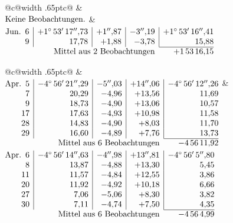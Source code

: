 \noindent\begin{tabular}{@{}c@{\hspace{.4em}\vrule width .65pt\hspace{.4em}}c@{}}
 &
 \\[.18ex]
\(\begin{array}[t]{@{}l@{}}\text{Keine Beobachtungen.}\end{array}\)
&
\(\begin{array}[t]{@{}r|r|r|r|r@{}}
\text{Jun.}\enspace 6 & +1^\circ\,53'\,17''{,}73 & +1''{,}87 & -3''{,}19 & +1^\circ\,53'\,16''{,}41\\
9 & 17{,}78 & +1{,}88 & -3{,}78 & 15{,}88\\
\cline{5-5}
\multicolumn{4}{r}{\text{Mittel aus 2 Beobachtungen}} & +1\,53\,16{,}15
\end{array}\)
\end{tabular}\par\medskip
{}
\noindent\begin{tabular}{@{}c@{\hspace{.4em}\vrule width .65pt\hspace{.4em}}c@{}}
 &
 \\[.18ex]
\(\begin{array}[t]{@{}r|r|r|r|r@{}}
\text{Apr.}\enspace 5 & -4^\circ\,56'\,21''{,}29 & -5''{,}03 & +14''{,}06 & -4^\circ\,56'\,12''{,}26\\
7 & 20{,}29 & -4{,}96 & +13{,}56 & 11{,}69\\
9 & 18{,}73 & -4{,}90 & +13{,}06 & 10{,}57\\
17 & 17{,}63 & -4{,}93 & +10{,}98 & 11{,}58\\
28 & 14{,}83 & -4{,}90 & +8{,}03 & 11{,}70\\
29 & 16{,}60 & -4{,}89 & +7{,}76 & 13{,}73\\
\cline{5-5}
\multicolumn{4}{r}{\text{Mittel aus 6 Beobachtungen}} & -4\,56\,11{,}92
\end{array}\)
&
\(\begin{array}[t]{@{}r|r|r|r|r@{}}
\text{Apr.}\enspace 6 & -4^\circ\,56'\,14''{,}63 & -4''{,}98 & +13''{,}81 & -4^\circ\,56'\,5''{,}80\\
8 & 13{,}87 & -4{,}88 & +13{,}30 & 5{,}45\\
11 & 11{,}57 & -4{,}84 & +12{,}55 & 3{,}86\\
20 & 11{,}92 & -4{,}92 & +10{,}18 & 6{,}66\\
27 & 7{,}06 & -5{,}06 & +8{,}30 & 3{,}82\\
30 & 7{,}11 & -4{,}74 & +7{,}50 & 4{,}35\\
\cline{5-5}
\multicolumn{4}{r}{\text{Mittel aus 6 Beobachtungen}} & -4\,56\,4{,}99
\end{array}\)
\end{tabular}\par\medskip
